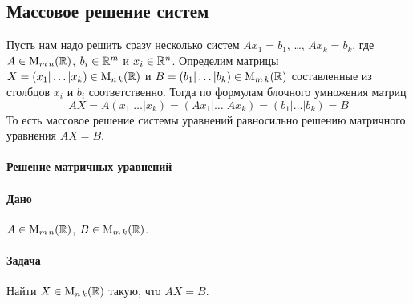 \subsection{Массовое решение систем}

Пусть нам надо решить сразу несколько систем $Ax_1 = b_1$, \ldots, $Ax_k = b_k$, где $A\in \operatorname{M}_{m\,n}(\mathbb R)$, $b_i\in \mathbb R^{m}$ и $x_i\in \mathbb R^{n}$.
Определим матрицы $X = (x_1|\ldots|x_k)\in \operatorname{M}_{n\,k}(\mathbb R)$ и $B = (b_1|\ldots|b_k)\in \operatorname{M}_{m\,k}(\mathbb R)$ составленные из столбцов $x_i$ и $b_i$ соответственно.
Тогда по формулам блочного умножения матриц
\[
AX = A(x_1|\ldots|x_k) = (Ax_1|\ldots|Ax_k) = (b_1|\ldots|b_k) = B
\]
То есть массовое решение системы уравнений равносильно решению матричного уравнения $AX = B$.

\paragraph{Решение матричных уравнений}

\paragraph{Дано}
$A\in \operatorname{M}_{m\,n}(\mathbb R)$, $B\in \operatorname{M}_{m\,k}(\mathbb R)$.

\paragraph{Задача}
Найти $X\in \operatorname{M}_{n\,k}(\mathbb R)$ такую, что $AX = B$.

